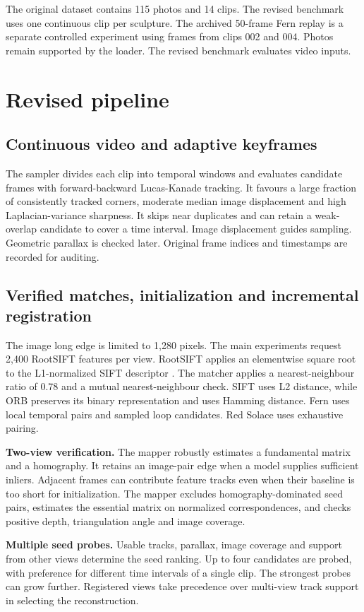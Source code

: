 \documentclass[11pt,a4paper]{article}
\begin{document}
The original dataset contains 115 photos and 14 clips. The revised benchmark
uses one continuous clip per sculpture. The archived 50-frame Fern replay is a
separate controlled experiment using frames from clips 002 and 004. Photos
remain supported by the loader. The revised benchmark evaluates video inputs.

\section{Revised pipeline}
\subsection{Continuous video and adaptive keyframes}
The sampler divides each clip into temporal windows and evaluates candidate
frames with forward-backward Lucas-Kanade tracking. It favours a large fraction
of consistently tracked corners, moderate median image displacement and high
Laplacian-variance sharpness. It skips near duplicates and can retain a
weak-overlap candidate to cover a time interval. Image displacement guides
sampling. Geometric parallax is checked later. Original frame indices and
timestamps are recorded for auditing.

\clearpage
\subsection{Verified matches, initialization and incremental registration}
The image long edge is limited to 1,280 pixels. The main experiments request
2,400 RootSIFT features per view. RootSIFT applies an elementwise square root to
the L1-normalized SIFT descriptor \cite{rootsift}. The matcher applies a
nearest-neighbour ratio of 0.78 and a mutual nearest-neighbour check. SIFT uses
L2 distance, while ORB preserves its binary representation and uses Hamming
distance. Fern uses local temporal pairs and sampled loop candidates. Red
Solace uses exhaustive pairing.

\textbf{Two-view verification.} The mapper robustly estimates a fundamental
matrix and a homography. It retains an image-pair edge when a model supplies
sufficient inliers. Adjacent frames can contribute feature tracks even when
their baseline is too short for initialization. The mapper excludes
homography-dominated seed pairs, estimates the essential matrix on normalized
correspondences, and checks positive depth, triangulation angle and image coverage.

\textbf{Multiple seed probes.} Usable tracks, parallax, image coverage and
support from other views determine the seed ranking. Up to four candidates
are probed, with preference for different time intervals of a single clip.
The strongest probes can grow further. Registered views take precedence
over multi-view track support in selecting the reconstruction.
\end{document}
